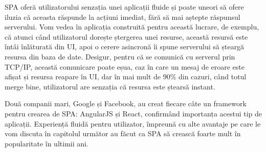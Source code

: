 SPA oferă utilizatorului senzația unei
aplicații fluide și poate uneori să ofere iluzia că aceasta răspunde la acțiuni
imediat, fără să mai aștepte răspunsul serverului. Vom vedea în aplicația
construită pentru această lucrare, de exemplu, că atunci când utilizatorul
dorește ștergerea unei resurse, această resursă este întâi înlăturată din UI,
apoi o cerere asincronă îi spune serverului să șteargă resursa din baza de date.
Desigur, pentru că se comunică cu serverul prin TCP/IP, această comunicare
poate eșua, caz în care un mesaj de eroare este afișat și resursa reapare în UI,
dar în mai mult de 90\% din cazuri, când totul merge bine, utilizatorul are
senzația că resursa este ștearsă instant.

Două companii mari, Google și Facebook,
au creat fiecare  câte un framework pentru crearea de SPA: AngularJS și React,
confirmând importanța acestui tip de aplicații. Experiență fluidă pentru utilizator, împreună cu alte avantaje pe care le
vom discuta în capitolul următor au făcut ca SPA să crească foarte mult în popularitate
în ultimii ani.



